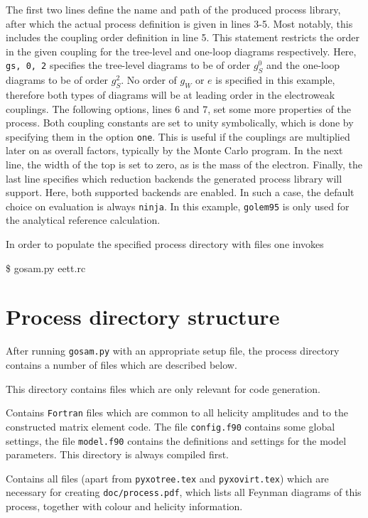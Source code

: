 \documentclass[11pt,a4paper]{refrep}
\begin{document}
The first two lines define the name and path of the produced process library, after which the actual process definition is given in lines 3-5. Most notably, this includes the coupling order definition in line 5. This statement restricts the order in the given coupling for the tree-level and one-loop diagrams respectively. Here, \texttt{gs, 0, 2} specifies the tree-level diagrams to be of order $g_S^0$ and the one-loop diagrams to be of order $g_S^2$. No order of $g_W$ or $e$ is specified in this example, therefore both types of diagrams will be at leading order in the electroweak couplings.
The following options, lines 6 and 7, set some more properties of the process. Both coupling constants are set to unity symbolically, which is done by specifying them in the option \texttt{one}. This is useful if the couplings are multiplied later on as overall factors, typically by the Monte Carlo program. In the next line, the width of the top is set to zero, as is the mass of the electron.
Finally, the last line specifies which reduction backends the generated process library will support. Here, both supported backends are enabled. In such a case, the default choice on evaluation is always \texttt{ninja}. In this example, \texttt{golem95} is only used for the analytical reference calculation.

In order to populate the specified process directory with files
one invokes
\begin{example}
\$ gosam.py eett.rc
\end{example}

\section{Process directory structure}



After running \texttt{gosam.py} with an appropriate setup file, the
process directory contains a number of files which are described below.

 This directory contains files which are only
relevant for code ge\-ne\-ration.

 Contains {\tt Fortran} files which are common to all helicity
amplitudes and to the constructed matrix element code. 
The file {\tt config.f90} contains some global  settings, the file {\tt model.f90}
contains the definitions and settings for the model parameters.
This directory is always compiled first.

 Contains all files (apart from
\texttt{pyxotree.tex} and \texttt{pyxovirt.tex}) which are
necessary for creating
\texttt{doc/process.pdf}, which lists all Feynman diagrams of this process, 
together with colour and helicity information.
\end{document}
